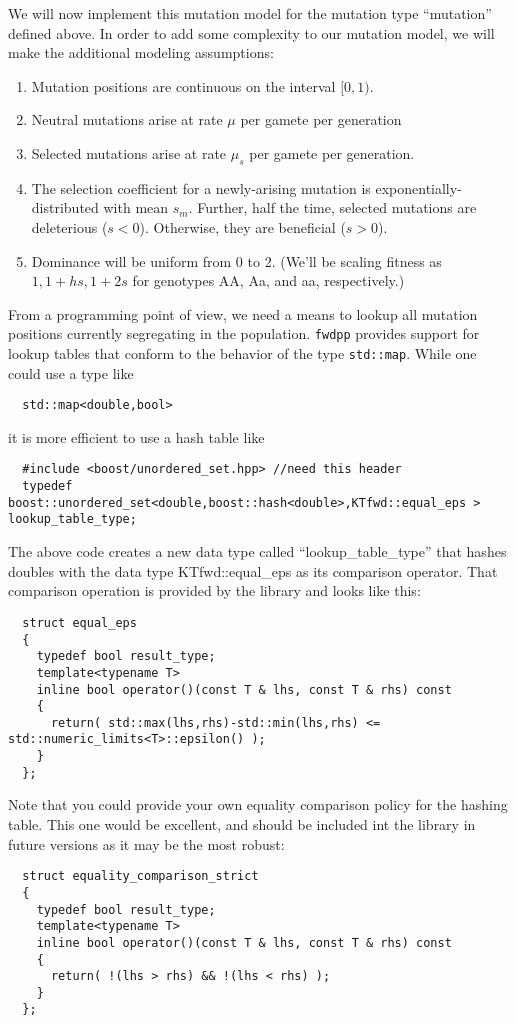 \documentclass{article}
\begin{document}
We will now implement this mutation model for the mutation type ``mutation'' defined above.  In order to add some complexity to our mutation model, we will make the additional modeling assumptions:
\begin{enumerate}
\item Mutation positions are continuous on the interval $[0,1)$.
\item Neutral mutations arise at rate $\mu$ per gamete per generation
\item Selected mutations arise at rate $\mu_s$ per gamete per generation.
\item The selection coefficient for a newly-arising mutation is exponentially-distributed with mean $s_m$.  Further, half the time, selected mutations are deleterious ($s < 0$).  Otherwise, they are beneficial ($s > 0$).
\item Dominance will be uniform from 0 to 2.  (We'll be scaling fitness as $1, 1+hs, 1+2s$ for genotypes AA, Aa, and aa, respectively.)
\end{enumerate}

From a programming point of view, we need a means to lookup all mutation positions currently segregating in the population.  \texttt{fwdpp} provides support for lookup tables that conform to the behavior of the type \texttt{std::map}.  While one could use a type like 
\begin{lstlisting}
  std::map<double,bool>
\end{lstlisting}
it is more efficient to use a hash table like 
\begin{lstlisting}
  #include <boost/unordered_set.hpp> //need this header
  typedef boost::unordered_set<double,boost::hash<double>,KTfwd::equal_eps > lookup_table_type;
\end{lstlisting}

The above code creates a new data type called ``lookup\_table\_type'' that hashes doubles with the data type KTfwd::equal\_eps as its comparison operator.  That comparison operation is provided by the library and looks like this:
\begin{lstlisting}
  struct equal_eps
  {
    typedef bool result_type;
    template<typename T>
    inline bool operator()(const T & lhs, const T & rhs) const
    {
      return( std::max(lhs,rhs)-std::min(lhs,rhs) <= std::numeric_limits<T>::epsilon() );
    }
  };
\end{lstlisting}

Note that you could provide your own equality comparison policy for the hashing table.  This one would be excellent, and should be included int the library in future versions as it may be the most robust:
\begin{lstlisting}
  struct equality_comparison_strict
  {
    typedef bool result_type;
    template<typename T>
    inline bool operator()(const T & lhs, const T & rhs) const
    {
      return( !(lhs > rhs) && !(lhs < rhs) );
    }
  };
\end{lstlisting}
\end{document}
